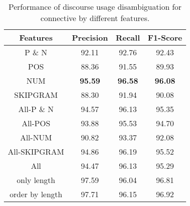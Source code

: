 \begin{table}[ht]
\centering
\begin{tabular}{|c|c|c|c|}
\hline

\bf Features            & \bf Precision & \bf Recall & \bf F1-Score \\ \hline
    P \& N              &     92.11     &     92.76  &     92.43    \\ \hline
    POS                 &     88.36     &     91.55  &     89.93    \\ \hline
    NUM                 & \bf 95.59     & \bf 96.58  & \bf 96.08    \\ \hline
    SKIPGRAM            &     88.30     &     91.94  &     90.08    \\ \hline
    All-P \& N          &     94.57     &     96.13  &     95.35    \\ \hline
    All-POS             &     93.88     &     95.53  &     94.70    \\ \hline
    All-NUM             &     90.82     &     93.37  &     92.08    \\ \hline
    All-SKIPGRAM        &     94.86     &     96.19  &     95.52    \\ \hline
    All                 &     94.47     &     96.13  &     95.29    \\

\hhline{|=|=|=|=|}

    only length         &     97.59     &     96.04  &     96.81    \\

\hhline{|=|=|=|=|}

    order by length     &     97.71     &     96.15  &     96.92    \\ \hline

\end{tabular}
\caption{\label{t:perfect-features} Performance of discourse usage
disambiguation for connective by different features. }
\end{table}
